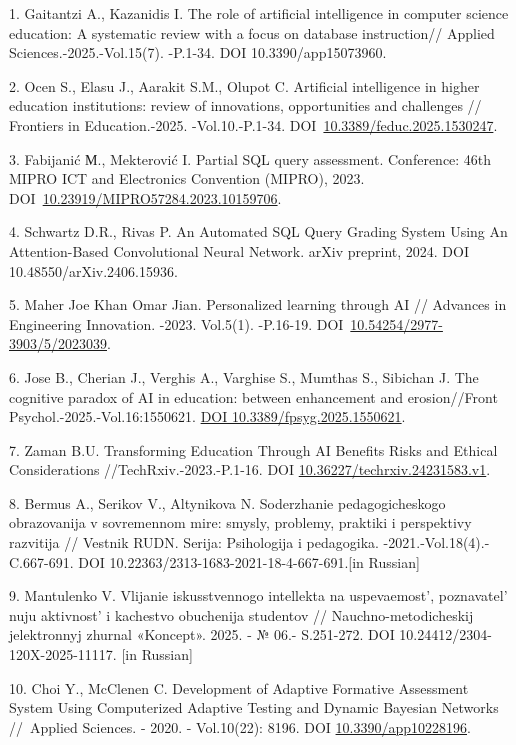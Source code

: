 \begin{refs}
1. Gaitantzi A., Kazanidis I. The role of artificial intelligence in
computer science education: A systematic review with a focus on database
instruction// Applied Sciences.-2025.-Vol.15(7). -P.1-34. DOI
10.3390/app15073960.

2. Ocen S., Elasu J., Aarakit S.M., Olupot C. Artificial intelligence in
higher education institutions: review of innovations, opportunities and
challenges // Frontiers in Education.-2025. -Vol.10.-P.1-34.
DOI~\href{https://doi.org/10.3389/feduc.2025.1530247}{10.3389/feduc.2025.1530247}.

3. Fabijanić М., Mekterović I. Partial SQL query assessment. Conference:
46th MIPRO ICT and Electronics Convention (MIPRO), 2023.
DOI~\href{https://doi.org/10.23919/MIPRO57284.2023.10159706}{10.23919/MIPRO57284.2023.10159706}.

4. Schwartz D.R., Rivas P. An Automated SQL Query Grading System Using
An Attention-Based Convolutional Neural Network. arXiv preprint, 2024.
DOI 10.48550/arXiv.2406.15936.

5. Maher Joe Khan Omar Jian. Personalized learning through AI //
Advances in Engineering Innovation. -2023. Vol.5(1). -P.16-19.
DOI~\href{https://doi.org/10.54254/2977-3903/5/2023039}{10.54254/2977-3903/5/2023039}.

6. Jose B., Cherian J., Verghis A., Varghise S., Mumthas S., Sibichan J.
The cognitive paradox of AI in education: between enhancement and
erosion//Front Psychol.-2025.-Vol.16:1550621.
\href{https://doi.org/10.3389/fpsyg.2025.1550621}{DOI
10.3389/fpsyg.2025.1550621}.

7. Zaman B.U. Transforming Education Through AI Benefits Risks and
Ethical Considerations //TechRxiv.-2023.-P.1-16. DOI
\href{https://doi.org/10.36227/techrxiv.24231583.v1}{10.36227/techrxiv.24231583.v1}.

8. Bermus A., Serikov V., Altynikova N. Soderzhanie pedagogicheskogo
obrazovanija v sovremennom mire: smysly, problemy, praktiki i
perspektivy razvitija // Vestnik RUDN. Serija: Psihologija i pedagogika.
-2021.-Vol.18(4).-C.667-691. DOI
10.22363/2313-1683-2021-18-4-667-691.{[}in Russian{]}

9. Mantulenko V. Vlijanie iskusstvennogo intellekta na uspevaemost',
poznavatel' nuju aktivnost'{} i kachestvo obuchenija studentov //
Nauchno-metodicheskij jelektronnyj zhurnal «Koncept».  2025. - № 06.-
S.251-272. DOI 10.24412/2304-120X-2025-11117. {[}in Russian{]}

10. Choi Y., McClenen C. Development of Adaptive Formative Assessment
System Using Computerized Adaptive Testing and Dynamic Bayesian Networks
//~Applied Sciences. - 2020. - Vol.10(22): 8196. DOI
\href{https://doi.org/10.3390/app10228196}{10.3390/app10228196}.


\end{refs}
